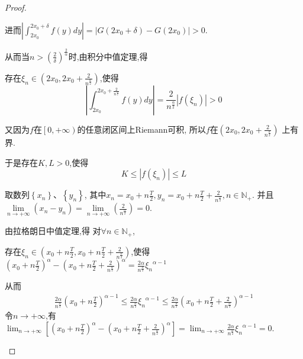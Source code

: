 \documentclass[../../main.tex]{subfiles}
\begin{document}
\begin{proof}
\begin{enumerate}[(1)]
进而$\left| \int_{2x_0}^{2x_0+\delta}{f\left( y \right) dy} \right|=\left| G\left( 2x_0+\delta \right) -G\left( 2x_0 \right) \right|>0$.

从而当$n>\left( \frac{2}{\delta} \right) ^{\frac{2}{\alpha}}$时,由积分中值定理,得

存在$\xi _n\in \left( 2x_0,2x_0+\frac{2}{n^{\frac{\alpha}{2}}} \right) $,使得
\begin{equation}\label{A}
\left| \int_{2x_0}^{2x_0+\frac{2}{n^{\frac{\alpha}{2}}}}{f\left( y \right) dy} \right|=\frac{2}{n^{\frac{\alpha}{2}}}\left| f\left( \xi _n \right) \right|>0
\end{equation}

又因为$f$在$\left[ 0,+\infty \right)$的任意闭区间上Riemann可积,
所以$f$在$\left( 2x_0,2x_0+\frac{2}{n^{\frac{\alpha}{2}}} \right) $
上有界.

于是存在$K,L> 0$,使得
\begin{equation}\label{B}
K\leqslant \left| f\left( \xi _n \right) \right|\leqslant L
\end{equation}

取数列$\left\{ x_n \right\} \text{、}\left\{ y_n \right\} $,
其中$x_n=x_0+n\frac{T}{2},y_n=x_0+n\frac{T}{2}+\frac{2}{n^{\frac{\alpha}{2}}},n\in \mathbb{N} _+$.
并且$\underset{n\rightarrow +\infty}{\lim}\left( x_n-y_n \right) =\underset{n\rightarrow +\infty}{\lim}\left( \frac{2}{n^{\frac{\alpha}{2}}} \right) =0$.

由拉格朗日中值定理,得
对$\forall n\in \mathbb{N} _+$,

存在$\xi _n\in \left( x_0+n\frac{T}{2},x_0+n\frac{T}{2}+\frac{2}{n^{\frac{\alpha}{2}}} \right) $,使得
$\left( x_0+n\frac{T}{2} \right) ^{\alpha}-\left( x_0+n\frac{T}{2}+\frac{2}{n^{\frac{\alpha}{2}}} \right) ^{\alpha}=\frac{2\alpha}{n^{\frac{\alpha}{2}}}{\xi _n}^{\alpha -1}$

从而
\begin{equation}
\begin{split}
\frac{2\alpha}{n^{\frac{\alpha}{2}}}\left( x_0+n\frac{T}{2} \right) ^{\alpha -1}\leqslant \frac{2\alpha}{n^{\frac{\alpha}{2}}}{\xi _n}^{\alpha -1}\leqslant \frac{2\alpha}{n^{\frac{\alpha}{2}}}\left( x_0+n\frac{T}{2}+\frac{2}{n^{\frac{\alpha}{2}}} \right) ^{\alpha -1}
\end{split}
\nonumber
\end{equation}
令$n\rightarrow +\infty$,有$\lim_{n\rightarrow +\infty} \left[ \left( x_0+n\frac{T}{2} \right) ^{\alpha}-\left( x_0+n\frac{T}{2}+\frac{2}{n^{\frac{\alpha}{2}}} \right) ^{\alpha} \right] =\lim_{n\rightarrow +\infty} \frac{2\alpha}{n^{\frac{\alpha}{2}}}{\xi _n}^{\alpha -1}=0$.


\end{enumerate}
\end{proof}
\end{document}
